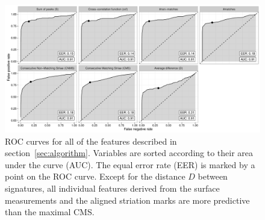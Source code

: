 \documentclass[aoas, preprint]{imsart}\usepackage[]{graphicx}\usepackage[]{color}
\newenvironment{knitrout}{}{} %
\begin{document}
\begin{figure}[hbtp]
  \centering
\begin{knitrout}
\color{fgcolor}
\includegraphics[width=\textwidth]{rocs-overview-1} 

\end{knitrout}
\caption{\label{fig:rocs}ROC curves for all of the features described in section~\ref{sec:algorithm}. Variables are sorted according to their area under the curve (AUC). The equal error rate (EER) is marked by a point on the ROC curve. Except for the distance $D$ between signatures, all individual features derived from the surface measurements and the aligned striation marks are more predictive than the maximal CMS. }
\end{figure}
\end{document}

